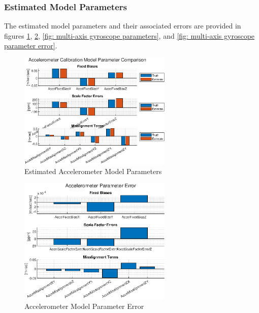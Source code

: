 \subsubsection{Estimated Model Parameters}

The estimated model parameters and their associated errors are provided in figures \ref{fig: multi-axis accelerometer parameters}, \ref{fig: multi-axis accelerometer parameter error}, \ref{fig: multi-axis gyroscope parameters}, and \ref{fig: multi-axis gyroscope parameter error}. 

\begin{figure}[h] 
	\centering
	\includegraphics[width=0.65\textwidth]{./images/MAM_accel_model_parameters.eps}
	\caption{Estimated Accelerometer Model Parameters}
	\label{fig: multi-axis accelerometer parameters}
\end{figure}
\FloatBarrier

\begin{figure}[h] 
	\centering
	\includegraphics[width=0.65\textwidth]{./images/MAM_accel_model_error.eps}
	\caption{Accelerometer Model Parameter Error}
	\label{fig: multi-axis accelerometer parameter error}
\end{figure}
\FloatBarrier

